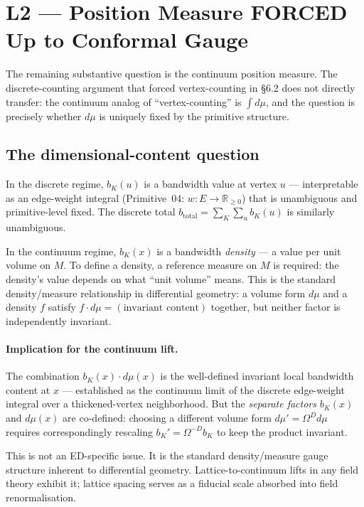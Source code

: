 \documentclass[11pt,a4paper]{article}
\begin{document}
\section{L2 --- Position Measure FORCED Up to Conformal Gauge}\label{sec:l2}

The remaining substantive question is the continuum position measure. The discrete-counting argument that forced vertex-counting in \S 6.2 does not directly transfer: the continuum analog of ``vertex-counting'' is $\int d\mu$, and the question is precisely whether $d\mu$ is uniquely fixed by the primitive structure.

\subsection{The dimensional-content question}

In the discrete regime, $b_K(u)$ is a bandwidth value at vertex $u$ --- interpretable as an edge-weight integral (Primitive~04: $w : E \to \mathbb{R}_{\geq 0}$) that is unambiguous and primitive-level fixed. The discrete total $b_\mathrm{total} = \sum_K \sum_u b_K(u)$ is similarly unambiguous.

In the continuum regime, $b_K(x)$ is a bandwidth \emph{density} --- a value per unit volume on $M$. To define a density, a reference measure on $M$ is required: the density's value depends on what ``unit volume'' means. This is the standard density/measure relationship in differential geometry: a volume form $d\mu$ and a density $f$ satisfy $f \cdot d\mu = (\text{invariant content})$ together, but neither factor is independently invariant.

\paragraph{Implication for the continuum lift.} The combination $b_K(x) \cdot d\mu(x)$ is the well-defined invariant local bandwidth content at $x$ --- established as the continuum limit of the discrete edge-weight integral over a thickened-vertex neighborhood. But the \emph{separate factors} $b_K(x)$ and $d\mu(x)$ are co-defined: choosing a different volume form $d\mu' = \Omega^D d\mu$ requires correspondingly rescaling $b_K' = \Omega^{-D} b_K$ to keep the product invariant.

This is not an ED-specific issue. It is the standard density/measure gauge structure inherent to differential geometry. Lattice-to-continuum lifts in any field theory exhibit it; lattice spacing serves as a fiducial scale absorbed into field renormalisation.
\end{document}
